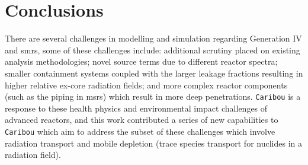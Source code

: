 \chapter{Conclusions} 
\label{conclusion}

There are several challenges in modelling and simulation regarding Generation IV and \acrshort{smrs}, some of these challenges include: additional scrutiny placed on existing analysis methodologies; novel source terms due to different reactor spectra; smaller containment systems coupled with the larger leakage fractions resulting in higher relative ex-core radiation fields; and more complex reactor components (such as the piping in \acrshort{msr}s) which result in more deep penetrations. \texttt{Caribou} is a response to these health physics and environmental impact challenges of advanced reactors, and this work contributed a series of new capabilities to \texttt{Caribou} which aim to address the subset of these challenges which involve radiation transport and mobile depletion (trace species transport for nuclides in a radiation field).

